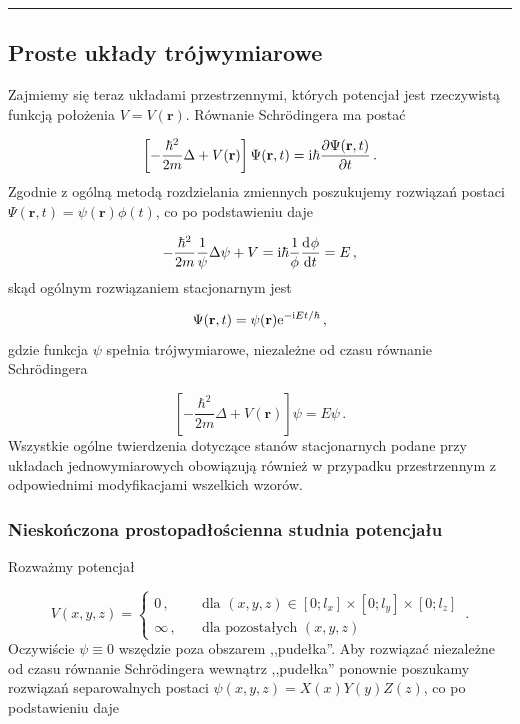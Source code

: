 \documentclass{myclass}
\begin{document}
\noindent\rule{\columnwidth}{0.5pt}

\subsection{Proste układy trójwymiarowe}

Zajmiemy się teraz układami przestrzennymi, których potencjał jest rzeczywistą funkcją położenia
\(V=V(\mathbf{r})\). Równanie Schr{\"o}dingera ma postać

\begin{equation*}
\left[-\frac{\hbar^2}{2m}\Delta+V(\mathbf{r})\right]\Psi(\mathbf{r},t)=\mathrm{i}\hbar\pdv{\Psi(\mathbf{r},t)}{t}\,.
\end{equation*}
Zgodnie z ogólną metodą rozdzielania zmiennych poszukujemy rozwiązań postaci
\(\Psi(\mathbf{r},t)=\psi(\mathbf{r})\phi(t)\), co po podstawieniu daje

\begin{equation*}
-\frac{\hbar^2}{2m}\frac{1}{\psi}\Delta\psi+V=\mathrm{i}\hbar\frac{1}{\phi}\dv[]{\phi}{t}=E\,,
\end{equation*}
skąd ogólnym rozwiązaniem stacjonarnym jest

\begin{equation*}
\Psi(\mathbf{r},t)=\psi(\mathbf{r})\mathrm{e}^{-\mathrm{i} Et/\hbar}\,,
\end{equation*}
gdzie funkcja \(\psi\) spełnia trójwymiarowe, niezależne od czasu równanie Schr{\"o}dingera

\begin{equation*}
\boxed{\left[-\frac{\hbar^2}{2m}\Delta+V(\mathbf{r})\right]\psi=E\psi}\,.
\end{equation*}
Wszystkie ogólne twierdzenia dotyczące stanów stacjonarnych podane przy układach jednowymiarowych
obowiązują również w przypadku przestrzennym z odpowiednimi modyfikacjami wszelkich wzorów.

\subsubsection{Nieskończona prostopadłościenna studnia potencjału}

Rozważmy potencjał 

\begin{equation*}
V(x,y,z)=\begin{cases}
0\,,&\quad\text{dla \((x,y,z)\in[0;l_x]\times[0;l_y]\times[0;l_z]\)}\\
\infty\,, &\quad\text{dla pozostałych \((x,y,z)\)}
\end{cases}\,.
\end{equation*}
Oczywiście \(\psi\equiv0\) wszędzie poza obszarem ,,pudełka''. Aby rozwiązać niezależne od czasu
równanie Schr{\"o}dingera wewnątrz ,,pudełka'' ponownie poszukamy rozwiązań separowalnych postaci
\(\psi(x,y,z)=X(x)Y(y)Z(z)\), co po podstawieniu daje
\end{document}
